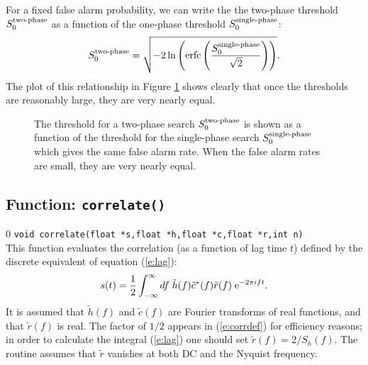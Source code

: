 For a fixed false alarm probability, we can write the the two-phase
threshold $S^{\small \textrm{two-phase}}_0$ as a function of the
one-phase threshold $S^{\small \textrm{single-phase}}_0$:
\begin{equation}
S^{\small \textrm{two-phase}}_0 = \sqrt{ - 2 \ln \left(\textrm{erfc}\left({S^{\small \textrm{single-phase}}_0 \over \sqrt{2}}\right) \right)}.
\end{equation}
The plot of this relationship in Figure \ref{f:thresholds} shows clearly
that once the thresholds are reasonably large, they are very nearly equal.
\begin{figure}[h]
\begin{center}
\caption{ \label{f:thresholds} The threshold for a two-phase search
$S^{\small \textrm{two-phase}}_0$ is shown as a function of the threshold
for the single-phase search $S^{\small \textrm{single-phase}}_0$ which
gives the same false alarm rate.  When the false alarm rates are small,
they are very nearly equal.  }
\end{center}
\end{figure}

\clearpage

\subsection{Function: \tt correlate()}
\label{ss:correlate}
\setcounter{equation}0
{\tt void correlate(float *s,float *h,float *c,float *r,int n)}\\
This function evaluates the correlation (as a function of lag time $t$)
defined by the discrete equivalent of equation (\ref{e:lag}):
\begin{equation}
\label{e:corrdef}
s(t) = {1 \over 2} \int_{-\infty}^\infty df \; { \tilde h(f) \tilde c^* (f) \tilde r (f) }
 \; {\rm e}^{- 2 \pi i f t}.
\end{equation}
It is assumed that $\tilde h(f)$ and $\tilde c(f)$ are Fourier
transforms of real functions, and that $\tilde r(f)$ is real.  The factor of
$1/2$ appears in (\ref{e:corrdef}) for efficiency reasons; in order to calculate
the integral (\ref{e:lag}) one should set $\tilde r(f) = 2/S_h(f)$.  The routine
assumes that $\tilde r$ vanishes at both DC and the Nyquist frequency.


